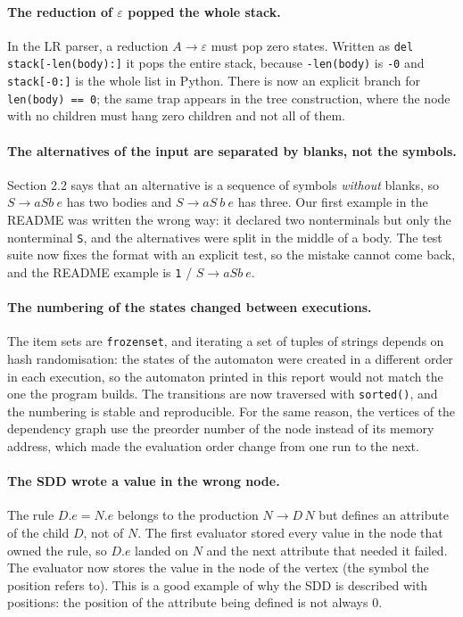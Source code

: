 \documentclass[11pt,letterpaper]{article}
\newcommand{\nt}[1]{\texttt{#1}}
\begin{document}
\paragraph{The reduction of $\varepsilon$ popped the whole stack.} In the LR parser, a reduction
$A \to \varepsilon$ must pop zero states. Written as \nt{del stack[-len(body):]} it pops the entire
stack, because \nt{-len(body)} is \nt{-0} and \nt{stack[-0:]} is the whole list in Python. There is
now an explicit branch for \nt{len(body) == 0}; the same trap appears in the tree construction,
where the node with no children must hang zero children and not all of them.

\paragraph{The alternatives of the input are separated by blanks, not the symbols.} Section 2.2 says
that an alternative is a sequence of symbols \emph{without} blanks, so $S \to aSb\ e$ has two bodies
and $S \to aS\ b\ e$ has three. Our first example in the README was written the wrong way: it
declared two nonterminals but only the nonterminal \nt{S}, and the alternatives were split in the
middle of a body. The test suite now fixes the format with an explicit test, so the mistake cannot
come back, and the README example is \nt{1} / $S \to aSb\ e$.

\paragraph{The numbering of the states changed between executions.} The item sets are
\nt{frozenset}, and iterating a set of tuples of strings depends on hash randomisation: the states
of the automaton were created in a different order in each execution, so the automaton printed in
this report would not match the one the program builds. The transitions are now traversed with
\nt{sorted()}, and the numbering is stable and reproducible. For the same reason, the vertices of
the dependency graph use the preorder number of the node instead of its memory address, which made
the evaluation order change from one run to the next.

\paragraph{The SDD wrote a value in the wrong node.} The rule $D.e = N.e$ belongs to the production
$N \to D\,N$ but defines an attribute of the child $D$, not of $N$. The first evaluator stored every
value in the node that owned the rule, so $D.e$ landed on $N$ and the next attribute that needed it
failed. The evaluator now stores the value in the node of the vertex (the symbol the position refers
to). This is a good example of why the SDD is described with positions: the position of the
attribute being defined is not always 0.
\end{document}
